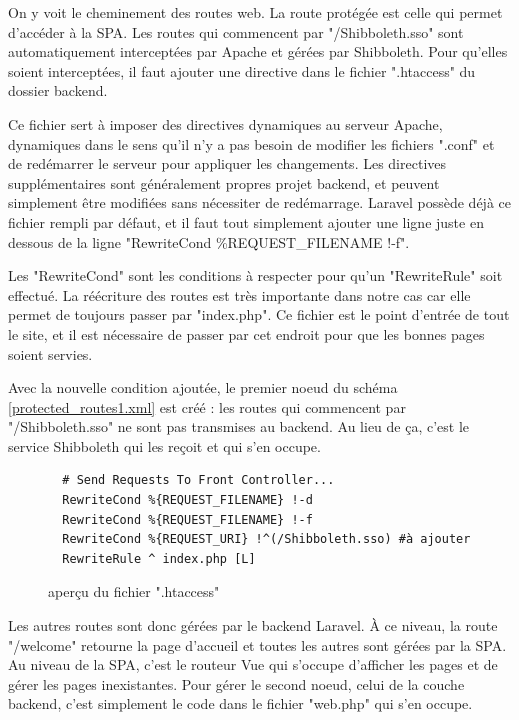 \documentclass[
    iai, %
    eai, %
]{heig-tb}
\begin{document}
On y voit le cheminement des routes web. La route protégée est celle qui permet d'accéder à la SPA. Les routes qui commencent par "/Shibboleth.sso" sont automatiquement interceptées par Apache et gérées par Shibboleth. Pour qu'elles soient interceptées, il faut ajouter une directive dans le fichier ".htaccess" du dossier backend.

Ce fichier sert à imposer des directives dynamiques au serveur Apache, dynamiques dans le sens qu'il n'y a pas besoin de modifier les fichiers ".conf" et de redémarrer le serveur pour appliquer les changements. Les directives supplémentaires sont généralement propres projet backend, et peuvent simplement être modifiées sans nécessiter de redémarrage.
Laravel possède déjà ce fichier rempli par défaut, et il faut tout simplement ajouter une ligne juste en dessous de la ligne "RewriteCond \%{REQUEST\_FILENAME} !-f".

Les "RewriteCond" sont les conditions à respecter pour qu'un "RewriteRule" soit effectué. La réécriture des routes est très importante dans notre cas car elle permet de toujours passer par "index.php". Ce fichier est le point d'entrée de tout le site, et il est nécessaire de passer par cet endroit pour que les bonnes pages soient servies.

\newpage
Avec la nouvelle condition ajoutée, le premier noeud du schéma \ref{protected_routes1.xml} est créé : les routes qui commencent par "/Shibboleth.sso" ne sont pas transmises au backend. Au lieu de ça, c'est le service Shibboleth qui les reçoit et qui s'en occupe.

\begin{figure}[h]
  \begin{verbatim}
  # Send Requests To Front Controller...
  RewriteCond %{REQUEST_FILENAME} !-d
  RewriteCond %{REQUEST_FILENAME} !-f
  RewriteCond %{REQUEST_URI} !^(/Shibboleth.sso) #à ajouter
  RewriteRule ^ index.php [L]
  \end{verbatim}
  \caption{aperçu du fichier ".htaccess"}
\end{figure}

Les autres routes sont donc gérées par le backend Laravel. À ce niveau, la route "/welcome" retourne la page d'accueil et toutes les autres sont gérées par la SPA. Au niveau de la SPA, c'est le routeur Vue qui s'occupe d'afficher les pages et de gérer les pages inexistantes.
Pour gérer le second noeud, celui de la couche backend, c'est simplement le code dans le fichier "web.php" qui s'en occupe.
\end{document}
